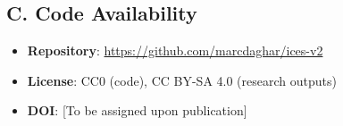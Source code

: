 \documentclass[12pt,a4paper]{article}
\begin{document}
\subsection*{C. Code Availability}

\begin{itemize}
    \item \textbf{Repository}: \url{https://github.com/marcdaghar/ices-v2}
    \item \textbf{License}: CC0 (code), CC BY-SA 4.0 (research outputs)
    \item \textbf{DOI}: [To be assigned upon publication]
\end{itemize}
\end{document}
